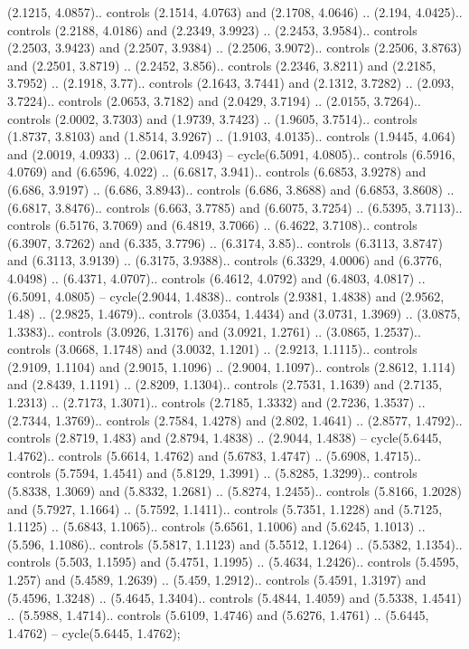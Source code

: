 (2.1215, 4.0857).. controls (2.1514, 4.0763) and (2.1708, 4.0646) .. (2.194, 4.0425).. controls (2.2188, 4.0186) and (2.2349, 3.9923) .. (2.2453, 3.9584).. controls (2.2503, 3.9423) and (2.2507, 3.9384) .. (2.2506, 3.9072).. controls (2.2506, 3.8763) and (2.2501, 3.8719) .. (2.2452, 3.856).. controls (2.2346, 3.8211) and (2.2185, 3.7952) .. (2.1918, 3.77).. controls (2.1643, 3.7441) and (2.1312, 3.7282) .. (2.093, 3.7224).. controls (2.0653, 3.7182) and (2.0429, 3.7194) .. (2.0155, 3.7264).. controls (2.0002, 3.7303) and (1.9739, 3.7423) .. (1.9605, 3.7514).. controls (1.8737, 3.8103) and (1.8514, 3.9267) .. (1.9103, 4.0135).. controls (1.9445, 4.064) and (2.0019, 4.0933) .. (2.0617, 4.0943) -- cycle(6.5091, 4.0805).. controls (6.5916, 4.0769) and (6.6596, 4.022) .. (6.6817, 3.941).. controls (6.6853, 3.9278) and (6.686, 3.9197) .. (6.686, 3.8943).. controls (6.686, 3.8688) and (6.6853, 3.8608) .. (6.6817, 3.8476).. controls (6.663, 3.7785) and (6.6075, 3.7254) .. (6.5395, 3.7113).. controls (6.5176, 3.7069) and (6.4819, 3.7066) .. (6.4622, 3.7108).. controls (6.3907, 3.7262) and (6.335, 3.7796) .. (6.3174, 3.85).. controls (6.3113, 3.8747) and (6.3113, 3.9139) .. (6.3175, 3.9388).. controls (6.3329, 4.0006) and (6.3776, 4.0498) .. (6.4371, 4.0707).. controls (6.4612, 4.0792) and (6.4803, 4.0817) .. (6.5091, 4.0805) -- cycle(2.9044, 1.4838).. controls (2.9381, 1.4838) and (2.9562, 1.48) .. (2.9825, 1.4679).. controls (3.0354, 1.4434) and (3.0731, 1.3969) .. (3.0875, 1.3383).. controls (3.0926, 1.3176) and (3.0921, 1.2761) .. (3.0865, 1.2537).. controls (3.0668, 1.1748) and (3.0032, 1.1201) .. (2.9213, 1.1115).. controls (2.9109, 1.1104) and (2.9015, 1.1096) .. (2.9004, 1.1097).. controls (2.8612, 1.114) and (2.8439, 1.1191) .. (2.8209, 1.1304).. controls (2.7531, 1.1639) and (2.7135, 1.2313) .. (2.7173, 1.3071).. controls (2.7185, 1.3332) and (2.7236, 1.3537) .. (2.7344, 1.3769).. controls (2.7584, 1.4278) and (2.802, 1.4641) .. (2.8577, 1.4792).. controls (2.8719, 1.483) and (2.8794, 1.4838) .. (2.9044, 1.4838) -- cycle(5.6445, 1.4762).. controls (5.6614, 1.4762) and (5.6783, 1.4747) .. (5.6908, 1.4715).. controls (5.7594, 1.4541) and (5.8129, 1.3991) .. (5.8285, 1.3299).. controls (5.8338, 1.3069) and (5.8332, 1.2681) .. (5.8274, 1.2455).. controls (5.8166, 1.2028) and (5.7927, 1.1664) .. (5.7592, 1.1411).. controls (5.7351, 1.1228) and (5.7125, 1.1125) .. (5.6843, 1.1065).. controls (5.6561, 1.1006) and (5.6245, 1.1013) .. (5.596, 1.1086).. controls (5.5817, 1.1123) and (5.5512, 1.1264) .. (5.5382, 1.1354).. controls (5.503, 1.1595) and (5.4751, 1.1995) .. (5.4634, 1.2426).. controls (5.4595, 1.257) and (5.4589, 1.2639) .. (5.459, 1.2912).. controls (5.4591, 1.3197) and (5.4596, 1.3248) .. (5.4645, 1.3404).. controls (5.4844, 1.4059) and (5.5338, 1.4541) .. (5.5988, 1.4714).. controls (5.6109, 1.4746) and (5.6276, 1.4761) .. (5.6445, 1.4762) -- cycle(5.6445, 1.4762);



